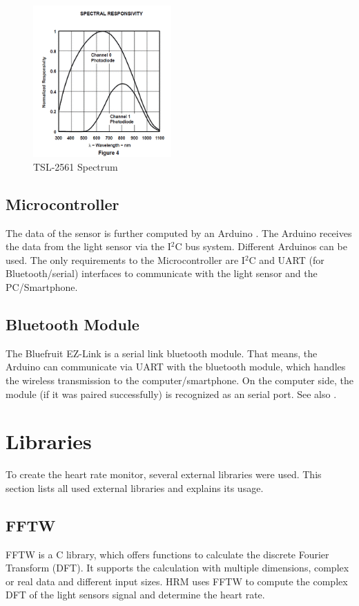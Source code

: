\documentclass[notitlepage]{scrreprt}
\begin{document}
\begin{figure}[H]
	\centering
	\includegraphics[width=200px]{images/light_tsl2561spectrum.png}
	\caption{TSL-2561 Spectrum}
	\label{fig:tsl-2561-spectrum}
\end{figure}

\subsection{Microcontroller}
The data of the sensor is further computed by an Arduino \cite{bib:arduino-board}. The Arduino receives the data from the light sensor via the I$^{2}$C bus system. Different Arduinos can be used. The only requirements to the Microcontroller are I$^{2}$C and UART (for Bluetooth/serial) interfaces to communicate with the light sensor and the PC/Smartphone.

\subsection{Bluetooth Module}
The Bluefruit EZ-Link is a serial link bluetooth module. That means, the Arduino can communicate via UART with the bluetooth module, which handles the wireless transmission to the computer/smartphone. On the computer side, the module (if it was paired successfully) is recognized as an serial port. See also \cite{bib:bluetooth-adapter}.

\newpage

\section{Libraries}
To create the heart rate monitor, several external libraries were used. This section lists all used external libraries and explains its usage.

\subsection{FFTW}
FFTW is a C library, which offers functions to calculate the discrete Fourier Transform (DFT). It supports the calculation with multiple dimensions, complex or real data and different input sizes. HRM uses FFTW to compute the complex DFT of the light sensors signal and determine the heart rate.
\end{document}
